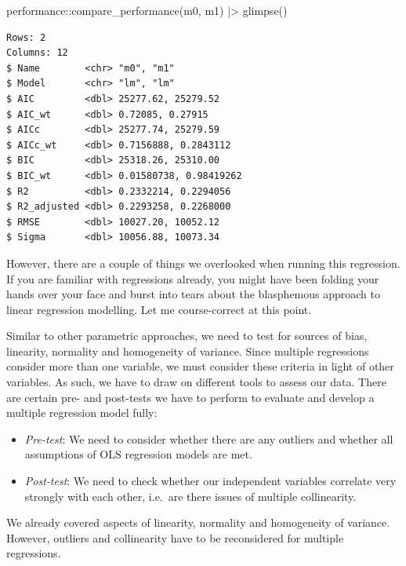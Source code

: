 \documentclass[
  letterpaper,
]{krantz}
\makeatletter
\newenvironment{Shaded}{\begin{snugshade}}{\end{snugshade}}
\newcommand{\FunctionTok}[1]{\textcolor[rgb]{0.28,0.35,0.67}{#1}}
\newcommand{\NormalTok}[1]{\textcolor[rgb]{0.00,0.23,0.31}{#1}}
\newcommand{\SpecialCharTok}[1]{\textcolor[rgb]{0.37,0.37,0.37}{#1}}
\newenvironment{kframe}{%
\medskip{}
\setlength{\fboxsep}{.8em}
 \def\at@end@of@kframe{}%
 \ifinner\ifhmode%
  \def\at@end@of@kframe{\end{minipage}}%
  \begin{minipage}{\columnwidth}%
 \fi\fi%
 \def\FrameCommand##1{\hskip\@totalleftmargin \hskip-\fboxsep
 \colorbox{shadecolor}{##1}\hskip-\fboxsep
     \hskip-\linewidth \hskip-\@totalleftmargin \hskip\columnwidth}%
 \MakeFramed {\advance\hsize-\width
   \@totalleftmargin\z@ \linewidth\hsize
   \@setminipage}}%
 {\par\unskip\endMakeFramed%
 \at@end@of@kframe}
\renewenvironment{Shaded}{\begin{kframe}}{\end{kframe}}
\makeatother
\begin{document}
\begin{Shaded}
\begin{Highlighting}[]
\NormalTok{performance}\SpecialCharTok{::}\FunctionTok{compare\_performance}\NormalTok{(m0, m1) }\SpecialCharTok{|\textgreater{}}
  \FunctionTok{glimpse}\NormalTok{()}
\end{Highlighting}
\end{Shaded}

\begin{verbatim}
Rows: 2
Columns: 12
$ Name        <chr> "m0", "m1"
$ Model       <chr> "lm", "lm"
$ AIC         <dbl> 25277.62, 25279.52
$ AIC_wt      <dbl> 0.72085, 0.27915
$ AICc        <dbl> 25277.74, 25279.59
$ AICc_wt     <dbl> 0.7156888, 0.2843112
$ BIC         <dbl> 25318.26, 25310.00
$ BIC_wt      <dbl> 0.01580738, 0.98419262
$ R2          <dbl> 0.2332214, 0.2294056
$ R2_adjusted <dbl> 0.2293258, 0.2268000
$ RMSE        <dbl> 10027.20, 10052.12
$ Sigma       <dbl> 10056.88, 10073.34
\end{verbatim}

However, there are a couple of things we overlooked when running this
regression. If you are familiar with regressions already, you might have
been folding your hands over your face and burst into tears about the
blasphemous approach to linear regression modelling. Let me
course-correct at this point.

Similar to other parametric approaches, we need to test for sources of
bias, linearity, normality and homogeneity of variance. Since multiple
regressions consider more than one variable, we must consider these
criteria in light of other variables. As such, we have to draw on
different tools to assess our data. There are certain pre- and
post-tests we have to perform to evaluate and develop a multiple
regression model fully:

\begin{itemize}
\item
  \emph{Pre-test}: We need to consider whether there are any outliers
  and whether all assumptions of OLS regression models are met.
\item
  \emph{Post-test}: We need to check whether our independent variables
  correlate very strongly with each other, i.e.~are there issues of
  multiple collinearity.
\end{itemize}

We already covered aspects of linearity, normality and homogeneity of
variance. However, outliers and collinearity have to be reconsidered for
multiple regressions.
\end{document}
